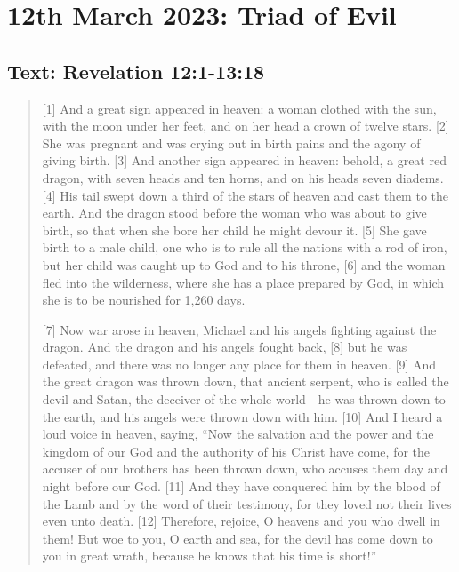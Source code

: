 \section{12th March 2023: Triad of Evil}
\subsection*{Text: Revelation 12:1-13:18}
  \begin{quote}
    [1] And a great sign appeared in heaven: a woman clothed with the sun,
    with the moon under her feet, and on her head a crown of twelve stars.
    [2] She was pregnant and was crying out in birth pains and the agony of
    giving birth.  [3] And another sign appeared in heaven: behold, a great
    red dragon, with seven heads and ten horns, and on his heads seven
    diadems.  [4] His tail swept down a third of the stars of heaven and cast
    them to the earth.  And the dragon stood before the woman who was about
    to give birth, so that when she bore her child he might devour it.  [5]
    She gave birth to a male child, one who is to rule all the nations with a
    rod of iron, but her child was caught up to God and to his throne, [6]
    and the woman fled into the wilderness, where she has a place prepared by
    God, in which she is to be nourished for 1,260 days.

    [7] Now war arose in heaven, Michael and his angels fighting against the
    dragon.  And the dragon and his angels fought back, [8] but he was
    defeated, and there was no longer any place for them in heaven.  [9] And
    the great dragon was thrown down, that ancient serpent, who is called the
    devil and Satan, the deceiver of the whole world—he was thrown down to
    the earth, and his angels were thrown down with him.  [10] And I heard a
    loud voice in heaven, saying, “Now the salvation and the power and the
    kingdom of our God and the authority of his Christ have come, for the
    accuser of our brothers has been thrown down, who accuses them day and
    night before our God.  [11] And they have conquered him by the blood of
    the Lamb and by the word of their testimony, for they loved not their
    lives even unto death.  [12] Therefore, rejoice, O heavens and you who
    dwell in them!  But woe to you, O earth and sea, for the devil has come
    down to you in great wrath, because he knows that his time is short!”


\end{quote}
